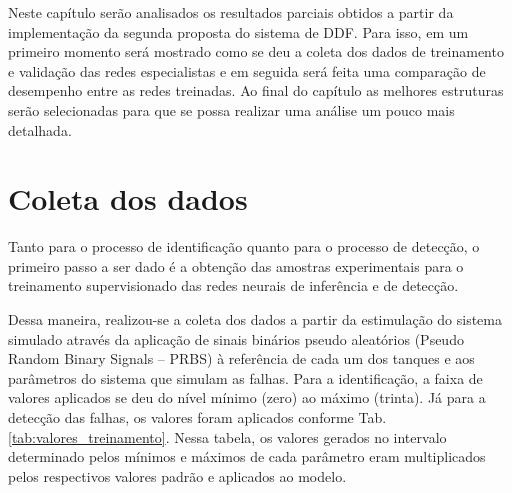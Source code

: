 \label{cap:resultados}

Neste capítulo serão analisados os resultados parciais obtidos a partir da
implementação da segunda proposta do sistema de DDF. Para isso, em um primeiro
momento será mostrado como se deu a coleta dos dados de treinamento e validação
das redes especialistas e em seguida será feita uma comparação de desempenho
entre as redes treinadas. Ao final do capítulo as melhores estruturas serão
selecionadas para que se possa realizar uma análise um pouco mais detalhada.

\section{Coleta dos dados}
Tanto para o processo de identificação quanto para o processo de detecção, o
primeiro passo a ser dado é a obtenção das amostras experimentais para o
treinamento supervisionado das redes neurais de inferência e de detecção.

Dessa maneira, realizou-se a coleta dos dados a partir da estimulação do sistema
simulado através da aplicação de sinais binários pseudo aleatórios ({Pseudo
Random Binary Signals} -- PRBS) à referência de cada um dos tanques e aos
parâmetros do sistema que simulam as falhas. Para a identificação, a faixa de
valores aplicados se deu do nível mínimo (zero) ao máximo (trinta). Já para a
detecção das falhas, os valores foram aplicados conforme Tab.
\ref{tab:valores_treinamento}. Nessa tabela, os valores gerados no
intervalo determinado pelos mínimos e máximos de cada parâmetro eram
multiplicados pelos respectivos valores padrão e aplicados ao modelo.

